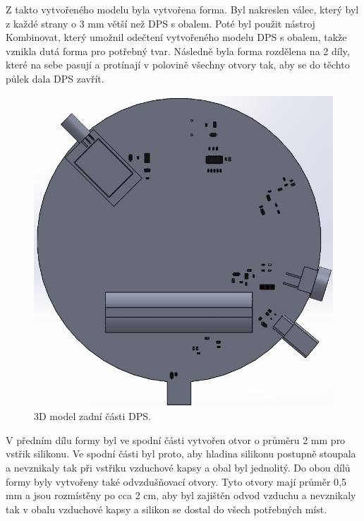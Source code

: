 Z takto vytvořeného modelu byla vytvořena forma. Byl nakreslen válec, který byl z každé strany o 3 mm větší než DPS s obalem. Poté byl použit nástroj Kombinovat, který umožnil odečtení vytvořeného 
modelu DPS s obalem, takže vznikla dutá forma pro potřebný tvar. Následně byla forma rozdělena na 2 díly, které na sebe pasují a protínají v polovině všechny otvory tak, aby se do těchto půlek 
dala DPS zavřít.

\begin{figure}[!h]
  \begin{center}
    \includegraphics[scale=0.4]{obrazky/3D_model_zadni.jpg}
  \end{center}
  \caption[3D model zadní části DPS]{3D model zadní části DPS.}
\end{figure}

V předním dílu formy byl ve spodní části vytvořen otvor o průměru 2 mm pro vstřik silikonu. Ve spodní části byl proto, aby hladina silikonu postupně stoupala a nevznikaly tak při vstřiku vzduchové 
kapsy a obal byl jednolitý. Do obou dílů formy byly vytvořeny také odvzdušňovací otvory. Tyto otvory mají průměr 0,5 mm a jsou rozmístěny po cca 2 cm, aby byl zajištěn odvod vzduchu a nevznikaly tak 
v obalu vzduchové kapsy a silikon se dostal do všech potřebných míst. 


